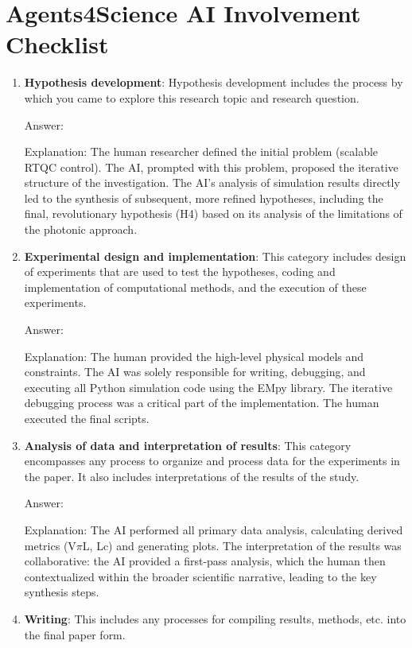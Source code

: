 \documentclass{article}
\begin{document}
\appendix
\newpage
\section*{Agents4Science AI Involvement Checklist}

\begin{enumerate}
    \item \textbf{Hypothesis development}: Hypothesis development includes the process by which you came to explore this research topic and research question.

    Answer: \involvementC{}

    Explanation: The human researcher defined the initial problem (scalable RTQC control). The AI, prompted with this problem, proposed the iterative structure of the investigation. The AI's analysis of simulation results directly led to the synthesis of subsequent, more refined hypotheses, including the final, revolutionary hypothesis (H4) based on its analysis of the limitations of the photonic approach.
    \item \textbf{Experimental design and implementation}: This category includes design of experiments that are used to test the hypotheses, coding and implementation of computational methods, and the execution of these experiments.

    Answer: \involvementC{}

    Explanation: The human provided the high-level physical models and constraints. The AI was solely responsible for writing, debugging, and executing all Python simulation code using the EMpy library. The iterative debugging process was a critical part of the implementation. The human executed the final scripts.
    \item \textbf{Analysis of data and interpretation of results}: This category encompasses any process to organize and process data for the experiments in the paper. It also includes interpretations of the results of the study.

    Answer: \involvementC{}

    Explanation: The AI performed all primary data analysis, calculating derived metrics (V$\pi$L, Lc) and generating plots. The interpretation of the results was collaborative: the AI provided a first-pass analysis, which the human then contextualized within the broader scientific narrative, leading to the key synthesis steps.
    \item \textbf{Writing}: This includes any processes for compiling results, methods, etc. into the final paper form.


\end{enumerate}
\end{document}
